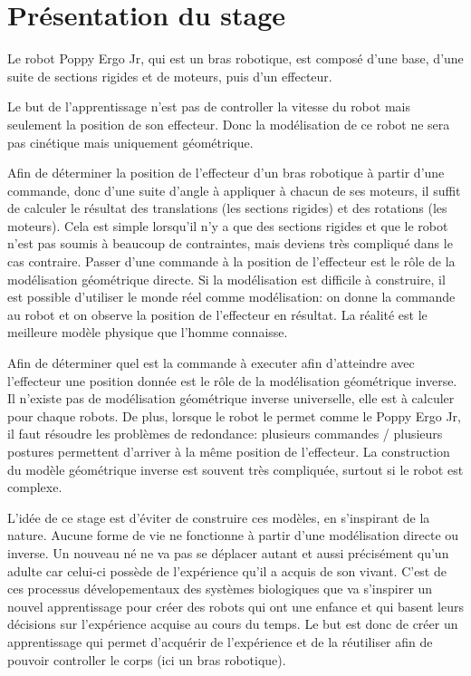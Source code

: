 \documentclass[11pt,french]{report}
\begin{document}
\chapter{Présentation du stage}

Le robot Poppy Ergo Jr, qui est un bras robotique, est composé d'une base, d'une suite de sections rigides et de moteurs, puis d'un effecteur.

Le but de l'apprentissage n'est pas de controller la vitesse du robot mais seulement la position de son effecteur.
Donc la modélisation de ce robot ne sera pas cinétique mais uniquement géométrique.

Afin de déterminer la position de l'effecteur d'un bras robotique à partir d'une commande, donc d'une suite d'angle à appliquer à chacun de ses moteurs, il suffit de calculer le résultat des translations (les sections rigides) et des rotations (les moteurs).
Cela est simple lorsqu'il n'y a que des sections rigides et que le robot n'est pas soumis à beaucoup de contraintes, mais deviens très compliqué dans le cas contraire.
Passer d'une commande à la position de l'effecteur est le rôle de la modélisation géométrique directe.
Si la modélisation est difficile à construire, il est possible d'utiliser le monde réel comme modélisation: on donne la commande au robot et on observe la position de l'effecteur en résultat.
La réalité est le meilleure modèle physique que l'homme connaisse.

Afin de déterminer quel est la commande à executer afin d'atteindre avec l'effecteur une position donnée est le rôle de la modélisation géométrique inverse.
Il n'existe pas de modélisation géométrique inverse universelle, elle est à calculer pour chaque robots.
De plus, lorsque le robot le permet comme le Poppy Ergo Jr, il faut résoudre les problèmes de redondance: plusieurs commandes / plusieurs postures permettent d'arriver à la même position de l'effecteur.
La construction du modèle géométrique inverse est souvent très compliquée, surtout si le robot est complexe.

L'idée de ce stage est d'éviter de construire ces modèles, en s'inspirant de la nature.
Aucune forme de vie ne fonctionne à partir d'une modélisation directe ou inverse.
Un nouveau né ne va pas se déplacer autant et aussi précisément qu'un adulte car celui-ci possède de l'expérience qu'il a acquis de son vivant.
C'est de ces processus dévelopementaux des systèmes biologiques que va s'inspirer un nouvel apprentissage pour créer des robots qui ont une enfance et qui basent leurs décisions sur l'expérience acquise au cours du temps.
Le but est donc de créer un apprentissage qui permet d'acquérir de l'expérience et de la réutiliser afin de pouvoir controller le corps (ici un bras robotique).
\end{document}
